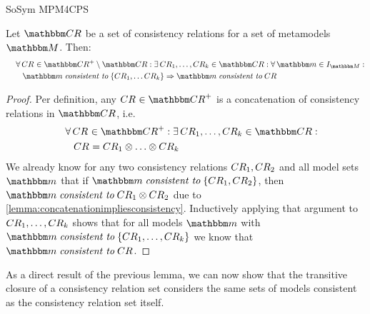 \begin{copiedFrom}{SoSym MPM4CPS}
\begin{lemma}
    Let $\consistencyrelationset{CR}$ be a set of consistency relations for a set of metamodels $\metamodelset{M}$. Then:
    \begin{align*}
        \formulaskip &
        \forall \consistencyrelation{CR}{} \in \transitiveclosure{\consistencyrelationset{CR}{}} \setminus \consistencyrelationset{CR} :
        \exists \consistencyrelation{CR}{1}, \dots, \consistencyrelation{CR}{k} \in \consistencyrelationset{CR} : \forall \modelset{m} \in \metamodelinstances{\metamodelset{M}} : \\
        & \formulaskip
        \modelset{m} \consistenttomath \setted{\consistencyrelation{CR}{1}, \dots \consistencyrelation{CR}{k}} \Rightarrow \modelset{m} \consistenttomath \consistencyrelation{CR}{} 
    \end{align*}
\end{lemma}

\begin{proof}
    Per definition, any $\consistencyrelation{CR}{} \in \transitiveclosure{\consistencyrelationset{CR}}$ is a concatenation of consistency relations in $\consistencyrelationset{CR}$, i.e.
    \begin{align*}
        \formulaskip &
        \forall \consistencyrelation{CR}{} \in \transitiveclosure{\consistencyrelationset{CR}} : \exists \consistencyrelation{CR}{1}, \dots, \consistencyrelation{CR}{k} \in \consistencyrelationset{CR} : \\
        & \formulaskip 
        \consistencyrelation{CR}{} = \consistencyrelation{CR}{1} \concat \dots \concat \consistencyrelation{CR}{k}
    \end{align*}
    We already know for any two consistency relations $CR_{1}, CR_{2}$ and all model sets $\modelset{m}$ that if $\modelset{m} \consistenttomath \setted{\consistencyrelation{CR}{1}, \consistencyrelation{CR}{2}}$, then $\modelset{m} \consistenttomath \consistencyrelation{CR}{1} \concat \consistencyrelation{CR}{2}$ due to \autoref{lemma:concatenationimpliesconsistency}.
    Inductively applying that argument to $CR_{1}, \dots, CR_{k}$ shows that for all models $\modelset{m}$ with $\modelset{m} \consistenttomath \setted{\consistencyrelation{CR}{1}, \dots, \consistencyrelation{CR}{k}}$ we know that $\modelset{m} \consistenttomath \consistencyrelation{CR}{}$.
\end{proof}

As a direct result of the previous lemma, we can now show that the transitive closure of a consistency relation set considers the same sets of models consistent as the consistency relation set itself.


\end{copiedFrom}
